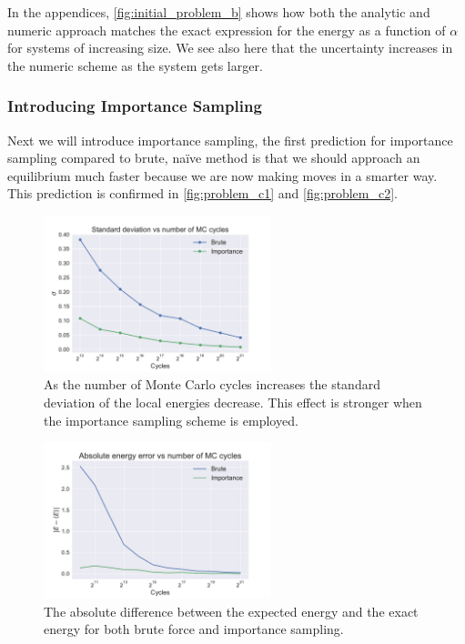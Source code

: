 \documentclass[
    a4paper, aps, twocolumn, floatfix, superscriptaddress, nofootinbib]{revtex4-1}
\newcommand{\1}{\mathds{1}}
\begin{document}
	In the appendices,  \autoref{fig:initial_problem_b} shows how both the analytic and numeric approach
	matches the exact expression for the energy as a function of $\alpha$ for systems of increasing size. 
	We see also here that the uncertainty increases in the numeric scheme as the system gets larger. 

	\subsubsection{Introducing Importance Sampling}
	
	Next we will introduce importance sampling, the first prediction for importance sampling compared to 
	brute, naïve method is that we should approach an equilibrium much faster because we are now
	making moves in a smarter way. This prediction is confirmed in \autoref{fig:problem_c1} and 
	\autoref{fig:problem_c2}.
	
	\begin{figure}
		\centering
			\includegraphics[width=250px]{../data/figures/problem_c1.pdf}
			\caption{As the number of Monte Carlo cycles increases the standard deviation of the local energies 
			decrease. This effect is stronger when the importance sampling scheme is employed.}
			\label{fig:problem_c1}
	\end{figure}

	\begin{figure}
		\centering
			\includegraphics[width=250px]{../data/figures/problem_c2.pdf}
			\caption{The absolute difference between the expected energy and the exact energy for both brute force
			and importance sampling. }
			\label{fig:problem_c2}
	\end{figure}
\end{document}
